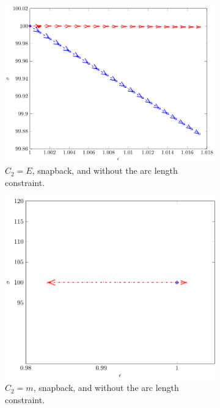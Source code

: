 \documentclass[11pt]{elsarticle}
\begin{document}
\begin{figure}
\begin{subfigure}{0.45\textwidth}
		\centering
		\includegraphics[scale=0.7]{./conv_figs/bad_metric_snap_no_arclength.pdf}
		\caption{$C_2=E$, snapback, and without the arc length constraint.}
		\label{bad_metric_snap_no_arclength}
	\end{subfigure}
	\hfill
	\begin{subfigure}{0.45\textwidth}
		\centering
		\includegraphics[scale=0.7]{./conv_figs/good_metric_snap_no_arclength.pdf}
		\caption{$C_2=m$, snapback, and without the arc length constraint.}
		\label{good_metric_snap_no_arclength}
	\end{subfigure}
	\begin{subfigure}{0.45\textwidth}

\end{subfigure}
\end{figure}
\end{document}
